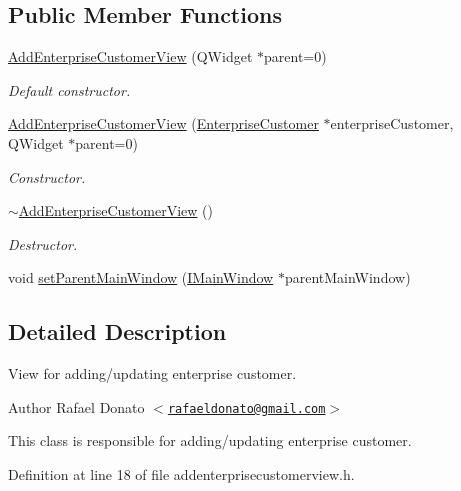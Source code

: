 \subsection*{\-Public \-Member \-Functions}
\begin{DoxyCompactItemize}
\item 
\hyperlink{class_add_enterprise_customer_view_a70b0bc040f8f564cba2ace68ce977fea}{\-Add\-Enterprise\-Customer\-View} (\-Q\-Widget $\ast$parent=0)
\begin{DoxyCompactList}\small\item\em \-Default constructor. \end{DoxyCompactList}\item 
\hyperlink{class_add_enterprise_customer_view_aad873fb84c19d3850935619948f344a8}{\-Add\-Enterprise\-Customer\-View} (\hyperlink{class_enterprise_customer}{\-Enterprise\-Customer} $\ast$enterprise\-Customer, \-Q\-Widget $\ast$parent=0)
\begin{DoxyCompactList}\small\item\em \-Constructor. \end{DoxyCompactList}\item 
\hyperlink{class_add_enterprise_customer_view_af2450a997b229c29f644f11781c070d6}{$\sim$\-Add\-Enterprise\-Customer\-View} ()
\begin{DoxyCompactList}\small\item\em \-Destructor. \end{DoxyCompactList}\item 
void \hyperlink{class_add_enterprise_customer_view_a42585601f809d31c6c5e957ed0477a0e}{set\-Parent\-Main\-Window} (\hyperlink{class_i_main_window}{\-I\-Main\-Window} $\ast$parent\-Main\-Window)
\end{DoxyCompactItemize}


\subsection{\-Detailed \-Description}
\-View for adding/updating enterprise customer. 

\begin{DoxyAuthor}{\-Author}
\-Rafael \-Donato $<$\href{mailto:rafaeldonato@gmail.com}{\tt rafaeldonato@gmail.\-com}$>$
\end{DoxyAuthor}
\-This class is responsible for adding/updating enterprise customer. 

\-Definition at line 18 of file addenterprisecustomerview.\-h.



